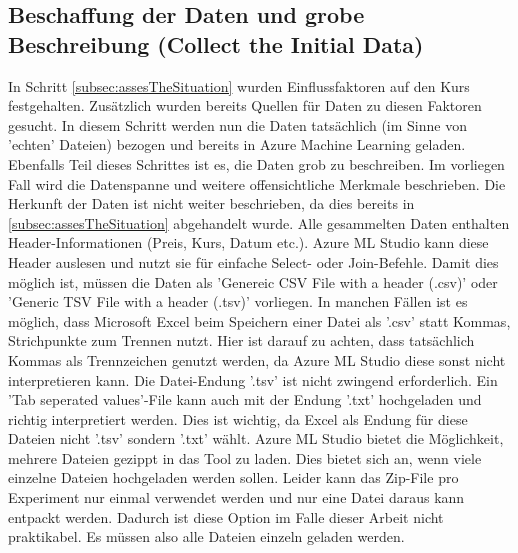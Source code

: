 \subsection*{Beschaffung der Daten und grobe Beschreibung (Collect the Initial Data)} \label{subsec:collection}
In Schritt \ref{subsec:assesTheSituation} wurden Einflussfaktoren auf den Kurs festgehalten. Zusätzlich wurden bereits Quellen für Daten zu diesen Faktoren gesucht. In diesem Schritt werden nun die Daten tatsächlich (im Sinne von 'echten' Dateien) bezogen und bereits in Azure Machine Learning geladen. Ebenfalls Teil dieses Schrittes ist es, die Daten grob zu beschreiben. Im vorliegen Fall wird die Datenspanne und weitere offensichtliche Merkmale beschrieben. Die Herkunft der Daten ist nicht weiter beschrieben, da dies bereits in \ref{subsec:assesTheSituation} abgehandelt wurde.\newline
Alle gesammelten Daten enthalten Header-Informationen (Preis, Kurs, Datum etc.). Azure ML Studio kann diese Header auslesen und nutzt sie für einfache Select- oder Join-Befehle. Damit dies möglich ist, müssen die Daten als 'Genereic CSV File with a header (.csv)' oder 'Generic TSV File with a header (.tsv)' vorliegen. In manchen Fällen ist es möglich, dass Microsoft Excel beim Speichern einer Datei als '.csv' statt Kommas, Strichpunkte zum Trennen nutzt. Hier ist darauf zu achten, dass tatsächlich Kommas als Trennzeichen genutzt werden, da Azure ML Studio diese sonst nicht interpretieren kann. Die Datei-Endung '.tsv' ist nicht zwingend erforderlich. Ein 'Tab seperated values'-File kann auch mit der Endung '.txt' hochgeladen und richtig interpretiert werden. Dies ist wichtig, da Excel als Endung für diese Dateien nicht '.tsv' sondern '.txt' wählt.\newline
Azure ML Studio bietet die Möglichkeit, mehrere Dateien gezippt in das Tool zu laden. Dies bietet sich an, wenn viele einzelne Dateien hochgeladen werden sollen. Leider kann das Zip-File pro Experiment nur einmal verwendet werden und nur eine Datei daraus kann entpackt werden. Dadurch ist diese Option im Falle dieser Arbeit nicht praktikabel. Es müssen also alle Dateien einzeln geladen werden.

